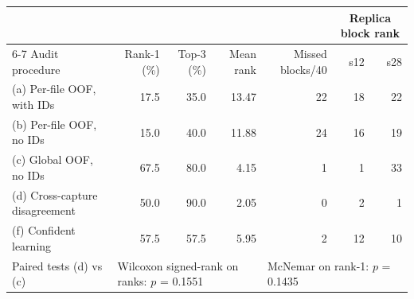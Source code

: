 \begin{tabular}{l rrr r rr}
\toprule
& & & & & \multicolumn{2}{c}{Replica block rank}\\
\cmidrule(lr){6-7}
Audit procedure & Rank-1 (\%) & Top-3 (\%) & Mean rank & Missed blocks/40 & s12 & s28\\
\midrule
(a) Per-file OOF, with IDs & 17.5 & 35.0 & 13.47 & 22 & 18 & 22\\
(b) Per-file OOF, no IDs & 15.0 & 40.0 & 11.88 & 24 & 16 & 19\\
(c) Global OOF, no IDs & 67.5 & 80.0 & 4.15 & 1 & 1 & 33\\
(d) Cross-capture disagreement & 50.0 & 90.0 & 2.05 & 0 & 2 & 1\\
(f) Confident learning & 57.5 & 57.5 & 5.95 & 2 & 12 & 10\\
\midrule
Paired tests (d) vs (c) & \multicolumn{3}{l}{Wilcoxon signed-rank on ranks: $p$ = 0.1551} & \multicolumn{3}{l}{McNemar on rank-1: $p$ = 0.1435}\\
\bottomrule
\end{tabular}

